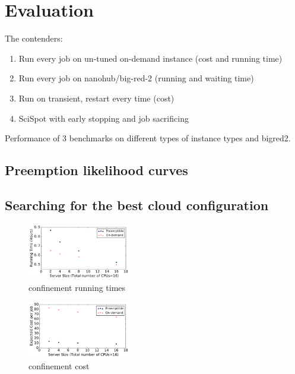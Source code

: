\section{Evaluation}

The contenders:
\begin{enumerate}
\item Run every job on un-tuned on-demand instance (cost and running time)
\item Run every job on nanohub/big-red-2 (running and waiting time)
\item Run on transient, restart every time (cost)
\item SciSpot with early stopping and job sacrificing 
\end{enumerate}

Performance of 3 benchmarks on different types of instance types and bigred2.



\subsection{Preemption likelihood curves}


\subsection{Searching for the best cloud configuration}

\begin{figure}[h]
  \centering
  \includegraphics[width=0.4\textwidth]{../graphs/confin_16_time.pdf}
  \caption{confinement running times}
  \label{fig:confin-16-times}
\end{figure}


\begin{figure}[h]
  \centering
  \includegraphics[width=0.4\textwidth]{../graphs/confin_16_cost.pdf}
  \caption{confinement cost}
  \label{fig:confin-16-cost}
\end{figure}


